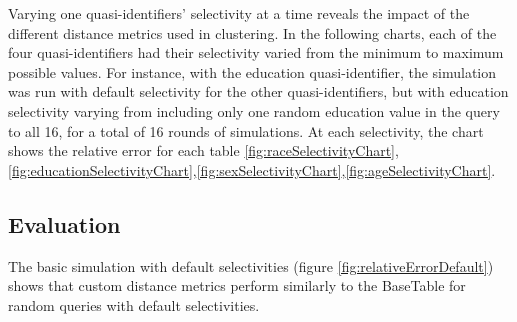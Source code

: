 Varying one quasi-identifiers' selectivity at a time reveals the impact of the different distance metrics used in clustering. In the following charts, each of the four quasi-identifiers had their selectivity varied from the minimum to maximum possible values. For instance, with the education quasi-identifier, the simulation was run with default selectivity for the other quasi-identifiers, but with education selectivity varying from including only one random education value in the query to all 16, for a total of 16 rounds of simulations. At each selectivity, the chart shows the relative error for each table \ref{fig:raceSelectivityChart},\ref{fig:educationSelectivityChart},\ref{fig:sexSelectivityChart},\ref{fig:ageSelectivityChart}.

\begin{figure*}
  \centering
  
  \caption{RaceTable Relative Error by Selectivity.\\At each selectivity, one simulation with 1000 queries of the form in figure \ref{fig:queryFormat} are run over each table.}
  \label{fig:raceSelectivityChart}
\end{figure*}
\begin{figure*}
  \centering
  
  \caption{EducationTable Relative Error by Selectivity.\\At each selectivity, one simulation with 1000 queries of the form in figure \ref{fig:queryFormat} are run over each table.}
  \label{fig:educationSelectivityChart}
\end{figure*}
\begin{figure*}
  \centering
  
  \caption{SexTable Relative Error by Selectivity.\\At each selectivity, one simulation with 1000 queries of the form in figure \ref{fig:queryFormat} are run over each table.}
  \label{fig:sexSelectivityChart}
\end{figure*}
\begin{figure*}
  \centering
  
  \caption{AgeTable Relative Error by Selectivity.\\At each selectivity, one simulation with 1000 queries of the form in figure \ref{fig:queryFormat} are run over each table.}
  \label{fig:ageSelectivityChart}
\end{figure*}

\subsection{Evaluation}
The basic simulation with default selectivities (figure \ref{fig:relativeErrorDefault}) shows that custom distance metrics perform similarly to the BaseTable for random queries with default selectivities.

